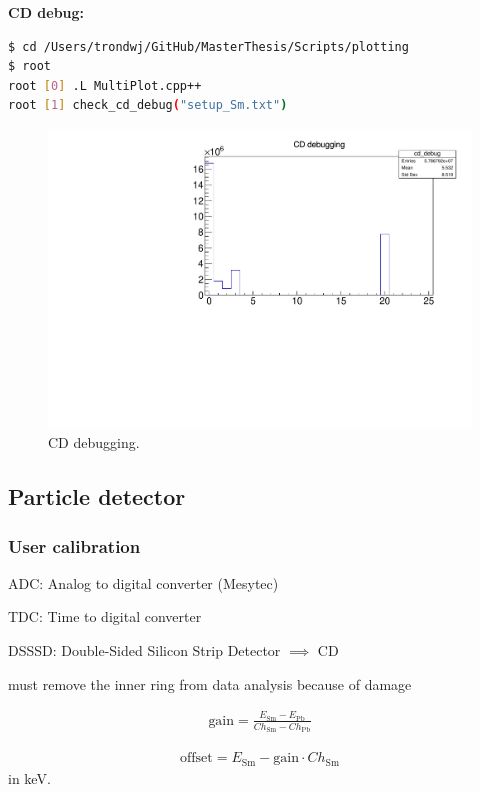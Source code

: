 \documentclass[twoside,english]{uiofysmaster/uiofysmaster}
\begin{document}
\textbf{CD debug:}

\begin{lstlisting}[language=sh]
$ cd /Users/trondwj/GitHub/MasterThesis/Scripts/plotting 
$ root
root [0] .L MultiPlot.cpp++
root [1] check_cd_debug("setup_Sm.txt")
\end{lstlisting}


\begin{figure}[ht]
	\centering
	\includegraphics[width=\textwidth]{../Plots/plotting/cd_debug-user.pdf}
	\caption{CD debugging.}
	\label{fig:CD_debug}
\end{figure}


\subsection{Particle detector}


\subsubsection{User calibration}
ADC: Analog to digital converter (Mesytec)

TDC: Time to digital converter

DSSSD: Double-Sided Silicon Strip Detector $\implies$ CD

must remove the inner ring from data analysis because of damage

\begin{align*}
	\text{gain} = \frac{E_{\text{Sm}} - E_{\text{Pb}}}{Ch_{\text{Sm}} - Ch_{\text{Pb}}}
\end{align*}

\begin{align*}
	\text{offset} = E_{\text{Sm}} - \text{gain} \cdot Ch_{\text{Sm}}
\end{align*}
in keV.
\end{document}
